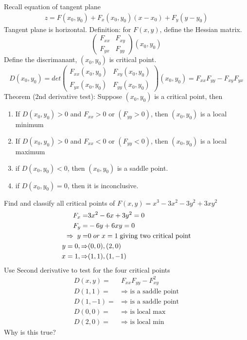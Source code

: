 \documentclass{article}
\begin{document}
        Recall equation of tangent plane
        \begin{align}
            z = F(x_0,y_0) + F_x(x_0,y_0)(x-x_0) + F_y(y-y_0)
        \end{align}
        Tangent plane is horizontal. Definition: for $F(x,y)$, define the Hessian matrix.
        \begin{equation}
            \begin{pmatrix}
                F_{xx} & F_{xy}\\
                F_{yx} & F_{yy}
            \end{pmatrix}(x_0,y_0)
        \end{equation}
        Define the discrimanant, $(x_0,y_0)$ is critical point. 
        \begin{equation}
            D(x_0,y_0) = det
            \begin{pmatrix}
                F_{xx}(x_0,y_0) & F_{xy}(x_0,y_0)\\
                F_{yx}(x_0,y_0) & F_{yy}(x_0,y_0)
            \end{pmatrix}(x_0,y_0)
            = F_{xx}F_{yy} - F_{xy}F_{yx}
        \end{equation}
        Theorem (2nd derivative test): Suppose $(x_0,y_0)$ is a critical point, then
        \begin{enumerate}
            \item If $D(x_0,y_0)>0$ and $F_{xx}>0$ or $(F_{yy} > 0)$, then $(x_0,y_0)$ is a local minimum
            \item If $D(x_0,y_0)>0$ and $F_{xx}<0$ or $(F_{yy} < 0)$, then $(x_0,y_0)$ is a local maximum
            \item if $D(x_0,y_0)<0$, then $(x_0,y_0)$ is a saddle point.
            \item if $D(x_0,y_0)=0$, then it is inconclusive.
        \end{enumerate}
        Find and classify all critical points of $F(x,y) = x^3 -3x^2 -3y^2 + 3xy^2$
        \begin{align}
            F_x =& 3x^2 - 6x + 3y^2 = 0\\
            F_y =& -6y + 6xy = 0\\
            \Rightarrow\;y=&0\;or\;x=1 \text{\;giving two critical point}\\
            y=0,\Rightarrow&(0,0),(2,0)\\
            x=1,\Rightarrow&(1,1),(1,-1)
        \end{align}
        Use Second derivative to test for the four critical points
        \begin{align}
            D(x,y) =& F_{xx}F_{yy} - F_{xy}^2\\
            D(1,1) =& \Rightarrow\text{ is a saddle point}\\
            D(1,-1)=& \Rightarrow\text{ is a saddle point}\\
            D(0,0) =& \Rightarrow\text{ is local max}\\
            D(2,0) =& \Rightarrow\text{ is local min}
        \end{align}
        Why is this true?
        
\end{document}
